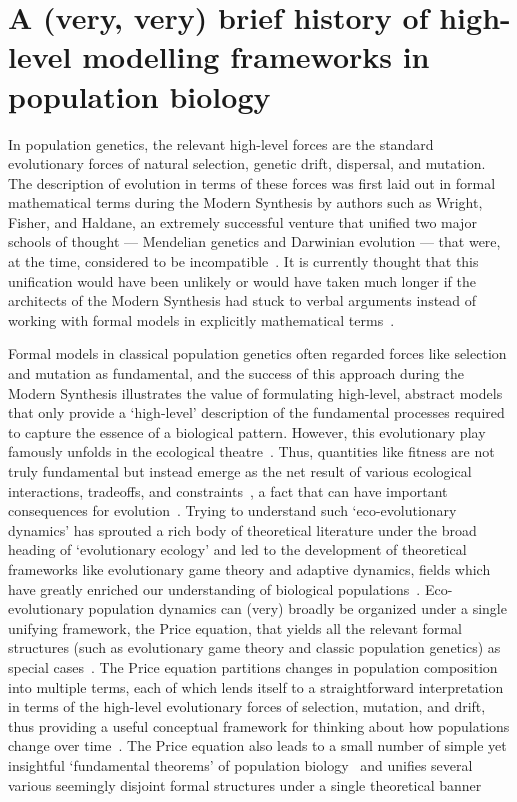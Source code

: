 \section{A (very, very) brief history of high-level modelling frameworks in population biology}

In population genetics, the relevant high-level forces are the standard evolutionary forces of natural selection, genetic drift, dispersal, and mutation. The description of evolution in terms of these forces was first laid out in formal mathematical terms during the Modern Synthesis by authors such as Wright, Fisher, and Haldane, an extremely successful venture that unified two major schools of thought --- Mendelian genetics and Darwinian evolution --- that were, at the time, considered to be incompatible~\citep{provine_origins_2001}. It is currently thought that this unification would have been unlikely or would have taken much longer if the architects of the Modern Synthesis had stuck to verbal arguments instead of working with formal models in explicitly mathematical terms~\citep{walsh_darwins_2014}. 

Formal models in classical population genetics often regarded forces like selection and mutation as fundamental, and the success of this approach during the Modern Synthesis illustrates the value of formulating high-level, abstract models that only provide a `high-level' description of the fundamental processes required to capture the essence of a biological pattern. However, this evolutionary play famously unfolds in the ecological theatre~\citep{hutchinson_ecological_1965}. Thus, quantities like fitness are not truly fundamental but instead emerge as the net result of various ecological interactions, tradeoffs, and constraints~\citep{metz_how_1992}, a fact that can have important consequences for evolution~\citep{coulson_putting_2006, kokko_can_2017}. Trying to understand such `eco-evolutionary dynamics' has sprouted a rich body of theoretical literature under the broad heading of `evolutionary ecology' and led to the development of theoretical frameworks like evolutionary game theory and adaptive dynamics, fields which have greatly enriched our understanding of biological populations~\citep{brown_why_2016}. Eco-evolutionary population dynamics can (very) broadly be organized under a single unifying framework, the Price equation, that yields all the relevant formal structures (such as evolutionary game theory and classic population genetics) as special cases~\citep{page_unifying_2002, queller_fundamental_2017, lion_theoretical_2018}. The Price equation partitions changes in population composition into multiple terms, each of which lends itself to a straightforward interpretation in terms of the high-level evolutionary forces of selection, mutation, and drift, thus providing a useful conceptual framework for thinking about how populations change over time~\citep{frank_natural_2012}. The Price equation also leads to a small number of simple yet insightful `fundamental theorems' of population biology~\citep{queller_fundamental_2017, lion_theoretical_2018, lehtonen_price_2018} and unifies several various seemingly disjoint formal structures under a single theoretical banner~\citep{ lehtonen_price_2020, luque_mirror_2021}

